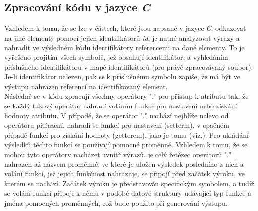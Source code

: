 \documentclass[11pt,twoside,a4paper]{book}
\begin{document}
\subsection{Zpracování kódu v jazyce \textit{C}}
Vzhledem k tomu, že se lze v částech, které jsou napsané v jazyce \textit{C}, odkazovat na jiné elementy pomocí jejich identifikátorů \textit{id}, je nutné analyzovat výrazy a nahradit ve výsledném kódu identifikátory referencemi na dané elementy. To je vyřešeno projitím všech symbolů, jež obsahují identifikátor, a vyhledáním příslušného identifikátoru v mapě identifikátorů (pro právě zpracovávaný soubor). Je-li identifikátor nalezen, pak se k příslušnému symbolu zapíše, že má být ve výstupu nahrazen referencí na identifikovaný element.\\
Následně se v kódu zpracují všechny operátory "." pro přístup k atributu tak, že se každý takový operátor nahradí voláním funkce pro nastavení nebo získání hodnoty atributu. V případě, že se operátor "." nachází nejblíže nalevo od operátoru přiřazení, nahradí se funkcí pro nastavení (setterm), v opačném případě funkcí pro získání hodnoty (getterem), jako je tomu (viz.). Pro ukládání výsledků těchto funkcí se používají pomocné proměnné. Vzhledem k tomu, že se mohou tyto operátory nacházet uvnitř výrazů, je celý řetězec operátorů "." nahrazen až názvem proměnné, ve které je uložen výsledek posledního z nich a volání funkcí, jež jejich funkčnost nahrazuje, se připojí před začátek výroku, ve kterém se nachází. Začátek výroku je představován specifickým symbolem, a tudíž se volání funkcí připojí k němu v podobě datové struktury udávající typ funkce a jména pomocných proměnných, což bude použito při generování výstupu.
\end{document}
